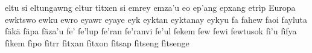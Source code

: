 \documentclass[a4paper]{article}
\begin{document}
eltu si\hspace{2mm}
eltungawng\hspace{2mm}
eltur tìtxen si\hspace{2mm}
emrey\hspace{2mm}
emza'u\hspace{2mm}
eo\hspace{2mm}
ep'ang\hspace{2mm}
epxang\hspace{2mm}
etrìp\hspace{2mm}
Europa\hspace{2mm}
ewktswo\hspace{2mm}
ewku\hspace{2mm}
ewro\hspace{2mm}
eyawr\hspace{2mm}
eyaye\hspace{2mm}
eyk\hspace{2mm}
eyktan\hspace{2mm}
eyktanay\hspace{2mm}
eykyu\hspace{2mm}
fa\hspace{2mm}
fahew\hspace{2mm}
faoi\hspace{2mm}
fayluta\hspace{2mm}
fäkä\hspace{2mm}
fäpa\hspace{2mm}
fäza'u\hspace{2mm}
fe'\hspace{2mm}
fe'lup\hspace{2mm}
fe'ran\hspace{2mm}
fe'ranvi\hspace{2mm}
fe'ul\hspace{2mm}
fekem\hspace{2mm}
few\hspace{2mm}
fewi\hspace{2mm}
fewtusok\hspace{2mm}
fì'u\hspace{2mm}
fìfya\hspace{2mm}
fìkem\hspace{2mm}
fìpo\hspace{2mm}
fìtrr\hspace{2mm}
fìtxan\hspace{2mm}
fìtxon\hspace{2mm}
fìtsap\hspace{2mm}
fìtseng\hspace{2mm}
fìtsenge\hspace{2mm}
\end{document}
